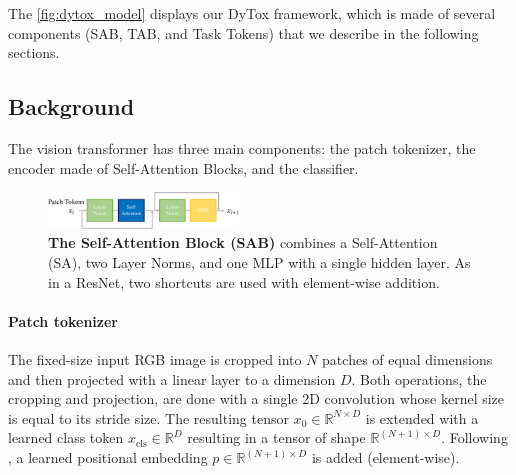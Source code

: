 The \autoref{fig:dytox_model} displays our DyTox framework, which is made of several components
(SAB, TAB, and Task Tokens) that we describe in the following sections.

\subsection{Background}
\label{sec:dytox_vit}

The vision transformer \citep{dosovitskiy2020vit} has three main components: the patch tokenizer, the
encoder made of Self-Attention Blocks, and the classifier.

\begin{figure}
    \centering
    \includegraphics[width=0.45\textwidth]{images/dytox/sab.pdf}
    \caption{\textbf{The Self-Attention Block (SAB)} combines a Self-Attention (SA), two Layer
        Norms, and one MLP with a single hidden layer. As in a ResNet, two shortcuts are used with
        element-wise addition.\vspace{-2em}}
    \label{fig:dytox_sab}
\end{figure}

\paragraph{Patch tokenizer}The fixed-size input RGB image is cropped into $N$ patches of equal
dimensions and then projected with a linear layer to a dimension $D$. Both operations, the cropping
and projection, are done with a single 2D convolution whose kernel size is equal to its stride size.
The resulting tensor $x_0 \in \mathbb{R}^{N \times D}$ is extended with a learned class token
$x_{\text{cls}} \in \mathbb{R}^D$ resulting in a tensor of shape $\mathbb{R}^{(N+1) \times D}$.
Following \citep{gehring2017posembeddings}, a learned positional embedding $p \in \mathbb{R}^{(N+1)
        \times D}$ is added (element-wise).



